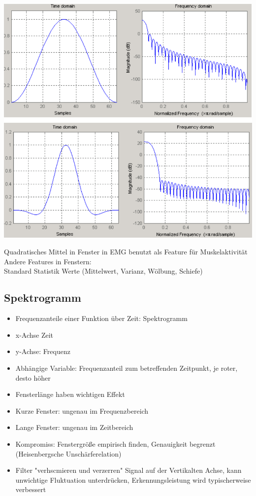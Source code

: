 \documentclass[a4paper,10pt,oneside]{article}
\begin{document}
\includegraphics[scale=0.65]{Grafiken/hanningflattopfenster.png}

Quadratisches Mittel in Fenster in EMG benutzt als Feature für Muskelaktivität\\
Andere Features in Fenstern: \\
Standard Statistik Werte (Mittelwert, Varianz, Wölbung, Schiefe)

\subsection{Spektrogramm}
\begin{itemize}
	\item Frequenzanteile einer Funktion über Zeit: Spektrogramm
	\item x-Achse Zeit
	\item y-Achse: Frequenz
	\item Abhängige Variable: Frequenzanteil zum betreffenden Zeitpunkt, je roter, desto höher
	\item Fensterlänge haben wichtigen Effekt
	\item Kurze Fenster: ungenau im Frequenzbereich
	\item Lange Fenster: ungenau im Zeitbereich
	\item Kompromiss: Fenstergröße empirisch finden, Genauigkeit begrenzt (Heisenbergsche Unschärferelation)
	\item Filter "verhscmieren und verzerren" Signal auf der Vertikalten Achse, kann unwichtige Fluktuation unterdrücken, Erkennungsleistung wird typischerweise verbessert
\end{itemize}
\end{document}
